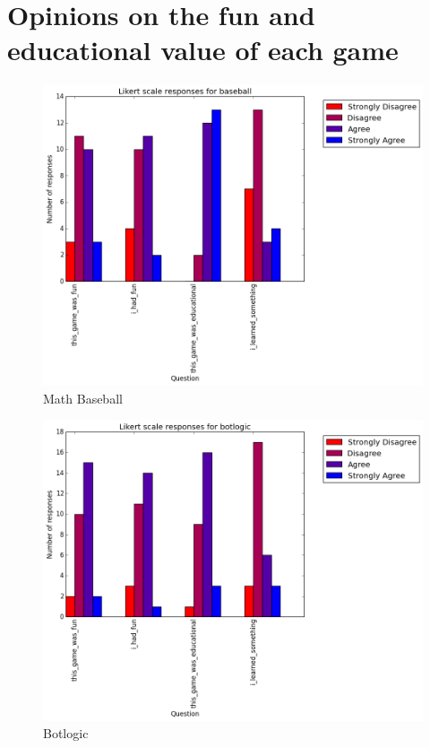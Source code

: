 			\clearpage

		\section{Opinions on the fun and educational value of each game}

			\begin{figure}[] 
			\centering 
			\includegraphics[width=\textwidth]{baseball_likert.png} 
			\caption{Math Baseball}
			\end{figure}

			\begin{figure}[] 
			\centering 
			\includegraphics[width=\textwidth]{botlogic_likert.png} 
			\caption{Botlogic}
			\end{figure}

